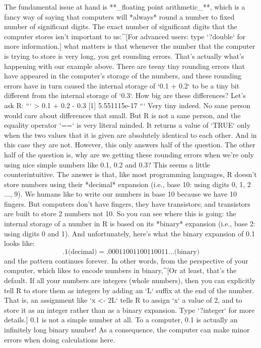 The fundamental issue at hand is **_floating point arithmetic_**, which is a fancy way of saying that computers will *always* round a number to fixed number of significant digits. The exact number of significant digits that the computer stores isn't important to us:^[For advanced users: type `?double` for more information.] what matters is that whenever the number that the computer is trying to store is very long, you get rounding errors. That's actually what's happening with our example above. There are teeny tiny rounding errors that have appeared in the computer's storage of the numbers, and these rounding errors have in turn caused the internal storage of `0.1 + 0.2` to be a tiny bit different from the internal storage of `0.3`. How big are these differences? Let's ask R:
```
> 0.1 + 0.2 - 0.3
[1] 5.551115e-17
```
Very tiny indeed. No sane person would care about differences that small. But R is not a sane person, and the equality operator `==` is very literal minded. It returns a value of `TRUE` only when the two values that it is given are absolutely identical to each other. And in this case they are not. However, this only answers half of the question. The other half of the question is, why are we getting these rounding errors when we're only using nice simple numbers like 0.1, 0.2 and 0.3? This seems a little counterintuitive. The answer is that, like most programming languages, R doesn't store numbers using their *decimal* expansion (i.e., base 10: using digits 0, 1, 2 ..., 9). We humans like to write our numbers in base 10 because we have 10 fingers. But computers don't have fingers, they have transistors; and transistors are built to store 2 numbers not 10. So you can see where this is going: the internal storage of a number in R is based on its *binary* expansion (i.e., base 2: using digits 0 and 1). And unfortunately, here's what the binary expansion of 0.1 looks like:
$$
.1 \mbox{(decimal)} = .00011001100110011... \mbox{(binary)} 
$$ 
and the pattern continues forever. In other words, from the perspective of your computer, which likes to encode numbers in binary,^[Or at least, that's the default. If all your numbers are integers (whole numbers), then you can explicitly tell R to store them as integers by adding an `L` suffix at the end of the number. That is, an assignment like `x <- 2L` tells R to assign `x` a value of 2, and to store it as an integer rather than as a binary expansion. Type `?integer` for more details.] 0.1 is not a simple number at all. To a computer, 0.1 is actually an infinitely long binary number! As a consequence, the computer can make minor errors when doing calculations here. 

